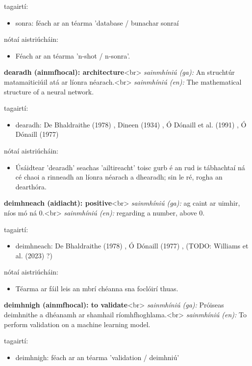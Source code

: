 \documentclass{article}
\begin{document}
tagairtí:
\begin{itemize}
	\item sonra: féach ar an téarma 'database / bunachar sonraí
\end{itemize}

nótaí aistriúcháin:
\begin{itemize}
	\item Féach ar an téarma 'n-shot / n-sonra'.
\end{itemize}


\textbf{dearadh (ainmfhocal): architecture}<br>
\textit{sainmhíniú (ga):} An struchtúr matamaiticiúil atá ar líonra néarach.<br>
\textit{sainmhíniú (en):} The mathematical structure of a neural network.

tagairtí:
\begin{itemize}
	\item dearadh: De Bhaldraithe (1978) \cite{de-bhaldraithe}, Dineen (1934) \cite{dineen}, Ó Dónaill et al. (1991) \cite{focloir-beag}, Ó Dónaill (1977) \cite{odonaill}
\end{itemize}

nótaí aistriúcháin:
\begin{itemize}
	\item Úsáidtear 'dearadh' seachas 'ailtireacht' toisc gurb é an rud is tábhachtaí ná cé chaoi a rinneadh an líonra néarach a dhearadh; sin le ré, rogha an dearthóra.
\end{itemize}


\textbf{deimhneach (aidiacht): positive}<br>
\textit{sainmhíniú (ga):} ag caint ar uimhir, níos mó ná 0.<br>
\textit{sainmhíniú (en):} regarding a number, above 0.

tagairtí:
\begin{itemize}
	\item deimhneach: De Bhaldraithe (1978) \cite{de-bhaldraithe}, Ó Dónaill (1977) \cite{odonaill}, (TODO: Williams et al. (2023) \cite{storchiste}?)
\end{itemize}

nótaí aistriúcháin:
\begin{itemize}
	\item Téarma ar fáil leis an mbrí chéanna sna foclóirí thuas.
\end{itemize}


\textbf{deimhnigh (ainmfhocal): to validate}<br>
\textit{sainmhíniú (ga):} Próiseas deimhnithe a dhéanamh ar shamhail ríomhfhoghlama.<br>
\textit{sainmhíniú (en):} To perform validation on a machine learning model.

tagairtí:
\begin{itemize}
	\item deimhnigh: féach ar an téarma 'validation / deimhniú'
\end{itemize}
\end{document}
